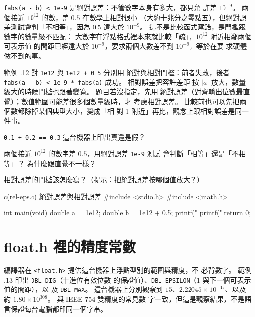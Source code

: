 
\texttt{fabs(a - b) < 1e-9} 是絕對誤差：不管數字本身有多大，都只允
許差 $10^{-9}$。 兩個接近 $10^{12}$ 的數，差 $0.5$ 在數學上相對很小
（大約十兆分之零點五），但絕對誤差測試會判「不相等」，因為 $0.5$
遠大於 $10^{-9}$。 這不是比較函式寫錯，是門檻跟數字的數量級不匹配：
大數字在浮點格式裡本來就比較「疏」，$10^{12}$ 附近相鄰兩個可表示值
的間距已經遠大於 $10^{-9}$，要求兩個大數差不到 $10^{-9}$，等於在要
求硬體做不到的事。

範例 \thechapter.12 對 \texttt{1e12} 與 \texttt{1e12 + 0.5} 分別用
絕對與相對門檻：前者失敗，後者
\texttt{fabs(a - b) < 1e-9 * fabs(a)} 成功。 相對誤差把容許差距
按 $|a|$ 放大，數量級大的時候門檻也跟著變寬。 題目若沒指定，先用
絕對誤差（對齊輸出位數最直覺）；數值範圍可能差很多個數量級時，才
考慮相對誤差。 比較前也可以先把兩個數都除掉某個典型大小，變成「相
對 $1$ 附近」再比，觀念上跟相對誤差是同一件事。

\begin{drills}[label=drills:float-abs-rel-error]
\item \texttt{0.1 + 0.2 == 0.3} 這台機器上印出真還是假？
\item 兩個接近 $10^{12}$ 的數字差 $0.5$，用絕對誤差 \texttt{1e-9} 測試
會判斷「相等」還是「不相等」？ 為什麼跟直覺不一樣？
\item 相對誤差的門檻該怎麼寫？（提示：把絕對誤差按哪個值放大？）
\end{drills}

\begin{example}{c}{(rel-eps.c) 絕對誤差與相對誤差}
#include <stdio.h>
#include <math.h>

int main(void) {
    double a = 1e12;
    double b = 1e12 + 0.5;
    printf("%
    printf("%
    return 0;
}
\end{example}


\section{float.h 裡的精度常數}
\label{sec:float-limits}

編譯器在 \texttt{<float.h>} 提供這台機器上浮點型別的範圍與精度，不
必背數字。 範例 \thechapter.13 印出 \texttt{DBL\_DIG}（十進位有效位數
的保證值）、\texttt{DBL\_EPSILON}（$1$ 與下一個可表示值的間距），以
及 \texttt{DBL\_MAX}。 這台機器上分別觀察到 $15$、$2.22045\times
10^{-16}$、以及約 $1.80\times 10^{308}$。 與 IEEE 754 雙精度的常見數
字一致，但這是觀察結果，不是語言保證每台電腦都印同一個字串。

